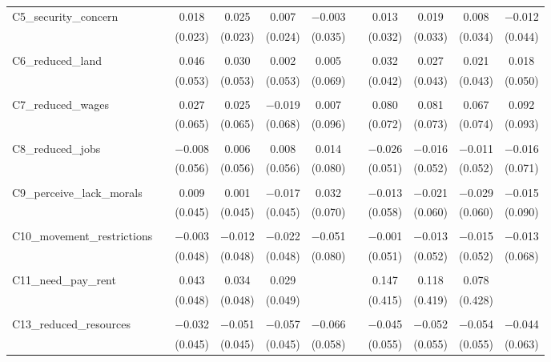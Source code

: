 \begin{table}[H]
\begin{tabular}{@{\extracolsep{4pt}}lcccccccccc}
 C5\_security\_concern &  & 0.018 & 0.025 & 0.007 & $-$0.003 &  & 0.013 & 0.019 & 0.008 & $-$0.012 \\ 
  &  & (0.023) & (0.023) & (0.024) & (0.035) &  & (0.032) & (0.033) & (0.034) & (0.044) \\ 
  & & & & & & & & & & \\ 
 C6\_reduced\_land &  & 0.046 & 0.030 & 0.002 & 0.005 &  & 0.032 & 0.027 & 0.021 & 0.018 \\ 
  &  & (0.053) & (0.053) & (0.053) & (0.069) &  & (0.042) & (0.043) & (0.043) & (0.050) \\ 
  & & & & & & & & & & \\ 
 C7\_reduced\_wages &  & 0.027 & 0.025 & $-$0.019 & 0.007 &  & 0.080 & 0.081 & 0.067 & 0.092 \\ 
  &  & (0.065) & (0.065) & (0.068) & (0.096) &  & (0.072) & (0.073) & (0.074) & (0.093) \\ 
  & & & & & & & & & & \\ 
 C8\_reduced\_jobs &  & $-$0.008 & 0.006 & 0.008 & 0.014 &  & $-$0.026 & $-$0.016 & $-$0.011 & $-$0.016 \\ 
  &  & (0.056) & (0.056) & (0.056) & (0.080) &  & (0.051) & (0.052) & (0.052) & (0.071) \\ 
  & & & & & & & & & & \\ 
 C9\_perceive\_lack\_morals &  & 0.009 & 0.001 & $-$0.017 & 0.032 &  & $-$0.013 & $-$0.021 & $-$0.029 & $-$0.015 \\ 
  &  & (0.045) & (0.045) & (0.045) & (0.070) &  & (0.058) & (0.060) & (0.060) & (0.090) \\ 
  & & & & & & & & & & \\ 
 C10\_movement\_restrictions &  & $-$0.003 & $-$0.012 & $-$0.022 & $-$0.051 &  & $-$0.001 & $-$0.013 & $-$0.015 & $-$0.013 \\ 
  &  & (0.048) & (0.048) & (0.048) & (0.080) &  & (0.051) & (0.052) & (0.052) & (0.068) \\ 
  & & & & & & & & & & \\ 
 C11\_need\_pay\_rent &  & 0.043 & 0.034 & 0.029 &  &  & 0.147 & 0.118 & 0.078 &  \\ 
  &  & (0.048) & (0.048) & (0.049) &  &  & (0.415) & (0.419) & (0.428) &  \\ 
  & & & & & & & & & & \\ 
 C13\_reduced\_resources &  & $-$0.032 & $-$0.051 & $-$0.057 & $-$0.066 &  & $-$0.045 & $-$0.052 & $-$0.054 & $-$0.044 \\ 
  &  & (0.045) & (0.045) & (0.045) & (0.058) &  & (0.055) & (0.055) & (0.055) & (0.063) \\ 

\end{tabular}
\end{table}
